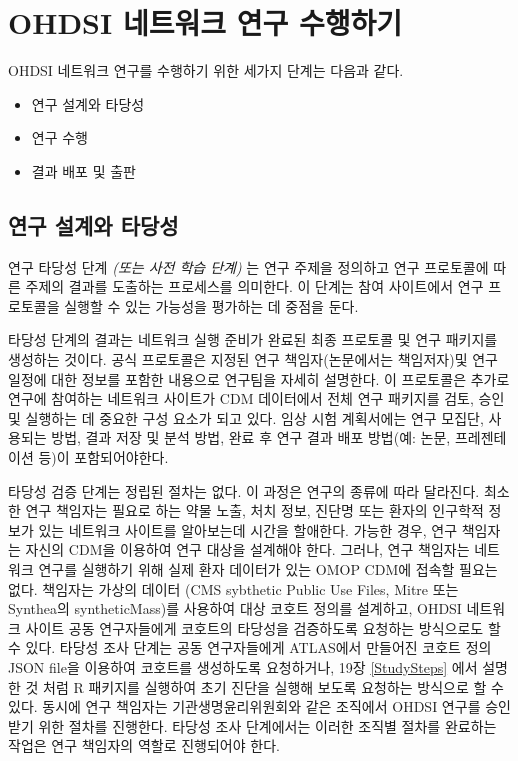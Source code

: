 \documentclass[11pt]{book}
\providecommand{\tightlist}{%
  \setlength{\itemsep}{0pt}\setlength{\parskip}{0pt}}
\theoremstyle{definition}
\theoremstyle{definition}
\theoremstyle{definition}
\theoremstyle{remark}
\begin{document}
\section{OHDSI 네트워크 연구 수행하기}\label{ohdsi---}


OHDSI 네트워크 연구를 수행하기 위한 세가지 단계는 다음과 같다.

\begin{itemize}
\tightlist
\item
  연구 설계와 타당성
\item
  연구 수행
\item
  결과 배포 및 출판
\end{itemize}

\subsection{연구 설계와 타당성}\label{--}

연구 타당성 단계 \emph{(또는 사전 학습 단계)} 는 연구 주제을 정의하고
연구 프로토콜에 따른 주제의 결과를 도출하는 프로세스를 의미한다. 이
단계는 참여 사이트에서 연구 프로토콜을 실행할 수 있는 가능성을 평가하는
데 중점을 둔다.

타당성 단계의 결과는 네트워크 실행 준비가 완료된 최종 프로토콜 및 연구
패키지를 생성하는 것이다. 공식 프로토콜은 지정된 연구 책임자(논문에서는
책임저자)및 연구 일정에 대한 정보를 포함한 내용으로 연구팀을 자세히
설명한다. 이 프로토콜은 추가로 연구에 참여하는 네트워크 사이트가 CDM
데이터에서 전체 연구 패키지를 검토, 승인 및 실행하는 데 중요한 구성
요소가 되고 있다. 임상 시험 계획서에는 연구 모집단, 사용되는 방법, 결과
저장 및 분석 방법, 완료 후 연구 결과 배포 방법(예: 논문, 프레젠테이션
등)이 포함되어야한다.

타당성 검증 단계는 정립된 절차는 없다. 이 과정은 연구의 종류에 따라
달라진다. 최소한 연구 책임자는 필요로 하는 약물 노출, 처치 정보, 진단명
또는 환자의 인구학적 정보가 있는 네트워크 사이트를 알아보는데 시간을
할애한다. 가능한 경우, 연구 책임자는 자신의 CDM을 이용하여 연구 대상을
설계해야 한다. 그러나, 연구 책임자는 네트워크 연구를 실행하기 위해 실제
환자 데이터가 있는 OMOP CDM에 접속할 필요는 없다. 책임자는 가상의 데이터
(CMS sybthetic Public Use Files, Mitre 또는 Synthea의 syntheticMass)를
사용하여 대상 코호트 정의를 설계하고, OHDSI 네트워크 사이트 공동
연구자들에게 코호트의 타당성을 검증하도록 요청하는 방식으로도 할 수
있다. 타당성 조사 단계는 공동 연구자들에게 ATLAS에서 만들어진 코호트
정의 JSON file을 이용하여 코호트를 생성하도록 요청하거나, 19장
\ref{StudySteps} 에서 설명한 것 처럼 R 패키지를 실행하여 초기 진단을
실행해 보도록 요청하는 방식으로 할 수 있다. 동시에 연구 책임자는
기관생명윤리위원회와 같은 조직에서 OHDSI 연구를 승인 받기 위한 절차를
진행한다. 타당성 조사 단계에서는 이러한 조직별 절차를 완료하는 작업은
연구 책임자의 역할로 진행되어야 한다.
\end{document}
